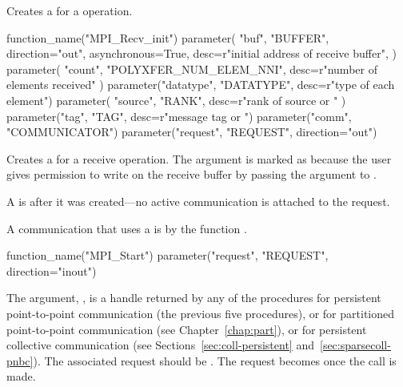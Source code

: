 Creates a 
for a  operation.

\begin{mpi-binding}
    function_name("MPI_Recv_init")
    parameter(
        "buf",
        "BUFFER",
        direction="out",
        asynchronous=True,
        desc=r"initial address of receive buffer",
    )
    parameter(
        "count", "POLYXFER_NUM_ELEM_NNI", desc=r"number of elements received"
    )
    parameter("datatype", "DATATYPE", desc=r"type of each element")
    parameter(
        "source", "RANK", desc=r"rank of source or "
    )
    parameter("tag", "TAG", desc=r"message tag or ")
    parameter("comm", "COMMUNICATOR")
    parameter("request", "REQUEST", direction="out")
\end{mpi-binding}

Creates a 
for a receive operation.
The argument  is marked as 
because the user gives permission to write on the receive buffer by passing the
argument to .

A  is  after it was created---no
active communication is attached to the request.

A communication that uses a 
is  by the function .

\begin{mpi-binding}
    function_name("MPI_Start")
    parameter("request", "REQUEST", direction="inout")
\end{mpi-binding}

The argument, , is a handle returned by
any of the  procedures
for persistent point-to-point communication (the previous five procedures), or
for partitioned point-to-point communication (see Chapter~\ref{chap:part}), or
for persistent collective communication (see Sections~\ref{sec:coll-persistent} and~\ref{sec:sparsecoll-pnbc}).
The associated request should be .
The request becomes  once the call is made.

